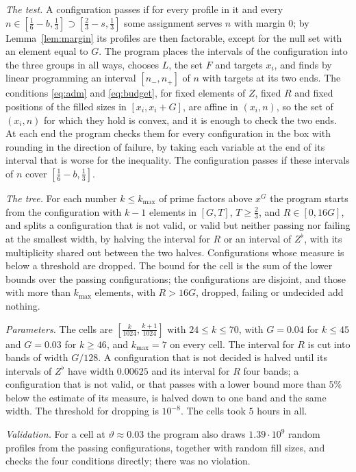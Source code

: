 \documentclass[aps,prd,twocolumn,superscriptaddress,nofootinbib,longbibliography,floatfix,showkeys,nobalancelastpage,amsmath,amssymb,10pt]{revtex4-2}
\theoremstyle{plain}
\theoremstyle{definition}
\theoremstyle{plain}
\begin{document}
\emph{The test.} A configuration passes if for every profile in it and every $n\in[\frac16-b,\frac13]\supset[\frac23-s,\frac13]$ some assignment serves $n$ with margin $0$; by Lemma~\ref{lem:margin} its profiles are then factorable, except for the null set with an element equal to $G$. The program places the intervals of the configuration into the three groups in all ways, chooses $L$, the set $F$ and targets $x_i$, and finds by linear programming an interval $[n_-,n_+]$ of $n$ with targets at its two ends. The conditions \eqref{eq:adm} and \eqref{eq:budget}, for fixed elements of $Z$, fixed $R$ and fixed positions of the filled sizes in $[x_i,x_i+G]$, are affine in $(x_i,n)$, so the set of $(x_i,n)$ for which they hold is convex, and it is enough to check the two ends. At each end the program checks them for every configuration in the box with rounding in the direction of failure, by taking each variable at the end of its interval that is worse for the inequality. The configuration passes if these intervals of $n$ cover $[\frac16-b,\frac13]$.

\emph{The tree.} For each number $k\le k_{\max}$ of prime factors above $x^G$ the program starts from the configuration with $k-1$ elements in $[G,T]$, $T\ge\frac23$, and $R\in[0,16G]$, and splits a configuration that is not valid, or valid but neither passing nor failing at the smallest width, by halving the interval for $R$ or an interval of $Z^\flat$, with its multiplicity shared out between the two halves. Configurations whose measure is below a threshold are dropped. The bound for the cell is the sum of the lower bounds over the passing configurations; the configurations are disjoint, and those with more than $k_{\max}$ elements, with $R>16G$, dropped, failing or undecided add nothing.

\emph{Parameters.} The cells are $[\frac k{1024},\frac{k+1}{1024}]$ with $24\le k\le70$, with $G=0.04$ for $k\le45$ and $G=0.03$ for $k\ge46$, and $k_{\max}=7$ on every cell. The interval for $R$ is cut into bands of width $G/128$. A configuration that is not decided is halved until its intervals of $Z^\flat$ have width $0.00625$ and its interval for $R$ four bands; a configuration that is not valid, or that passes with a lower bound more than $5\%$ below the estimate of its measure, is halved down to one band and the same width. The threshold for dropping is $10^{-8}$. The cells took $5$ hours in all.

\emph{Validation.} For a cell at $\vartheta\approx0.03$ the program also draws $1.39\cdot10^9$ random profiles from the passing configurations, together with random fill sizes, and checks the four conditions directly; there was no violation.
\end{document}
